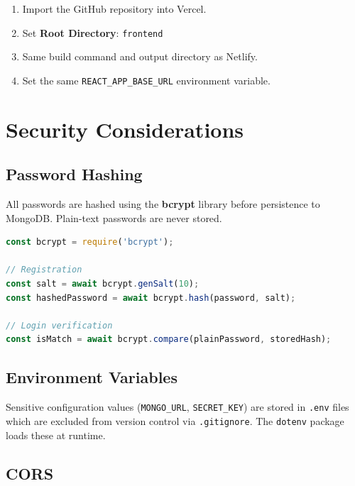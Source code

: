 \documentclass[12pt,a4paper]{report}
\begin{document}
\begin{enumerate}[leftmargin=2em]
  \item Import the GitHub repository into Vercel.
  \item Set \textbf{Root Directory}: \texttt{frontend}
  \item Same build command and output directory as Netlify.
  \item Set the same \texttt{REACT\_APP\_BASE\_URL} environment variable.
\end{enumerate}

\chapter{Security Considerations}

\section{Password Hashing}

All passwords are hashed using the \textbf{bcrypt} library before persistence to MongoDB. Plain-text passwords are never stored.

\begin{lstlisting}[language=JavaScript, caption=bcrypt usage in admin-controller.js]
const bcrypt = require('bcrypt');

// Registration
const salt = await bcrypt.genSalt(10);
const hashedPassword = await bcrypt.hash(password, salt);

// Login verification
const isMatch = await bcrypt.compare(plainPassword, storedHash);
\end{lstlisting}

\section{Environment Variables}

Sensitive configuration values (\texttt{MONGO\_URL}, \texttt{SECRET\_KEY}) are stored in \texttt{.env} files which are excluded from version control via \texttt{.gitignore}. The \texttt{dotenv} package loads these at runtime.

\section{CORS}
\end{document}
